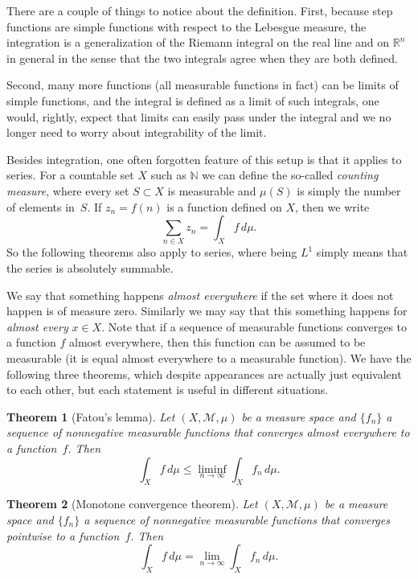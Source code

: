 \documentclass[12pt,openany]{book}
\newcommand{\R}{{\mathbb{R}}}
\newcommand{\N}{{\mathbb{N}}}
\newcommand{\sM}{{\mathscr{M}}}
\newcommand{\myindex}[1]{#1\index{#1}}
\theoremstyle{plain}
\newtheorem{thm}{Theorem}[section]
\theoremstyle{remark}
\theoremstyle{definition}
\theoremstyle{exercise}
\theoremstyle{example}
\begin{document}
There are a couple of things to notice about the definition.  First,
because step functions are simple functions with respect to the Lebesgue measure,
the integration is a generalization of the Riemann integral on the real line
and on $\R^n$ in general in the sense that the two integrals agree when they
are both defined.

Second, many more functions (all measurable functions in fact)
can be limits of simple functions, and the integral is defined as a limit of
such integrals, one would, rightly, expect that limits can easily pass under
the integral and we no longer need to worry about integrability of the
limit.

Besides integration, one often forgotten feature of this setup is that it
applies to series.  For a countable set $X$ such as $\N$ we can define
the so-called \emph{\myindex{counting measure}}, where every set $S \subset
X$ is measurable and $\mu(S)$ is simply the number of elements in~$S$.
If $z_n = f(n)$ is a function defined on $X$, then we write
\begin{equation*}
\sum_{n \in X} z_n = \int_X f \, d\mu .
\end{equation*}
So the following theorems also apply to series, where being $L^1$ simply
means that the series is absolutely summable.

We say that something happens \emph{\myindex{almost everywhere}} if the set
where it does not happen is of measure zero.  Similarly we may say that this
something happens for \emph{almost every} $x \in X$.  Note that if a
sequence of measurable functions converges to a function $f$ almost
everywhere, then this function can be assumed to be measurable (it is equal
almost everywhere to a measurable function).  We have the following three
theorems, which despite appearances are actually just equivalent to each
other, but each statement is useful in different situations.

\begin{thm}[Fatou's lemma]
\pagebreak[2]
Let $(X,\sM,\mu)$ be a measure space and
$\{ f_n \}$ a sequence of nonnegative measurable functions that converges
almost everywhere to a function~$f$.  Then
\begin{equation*}
\int_X f \, d\mu \leq \liminf_{n\to \infty} \int_X f_n \, d\mu .
\end{equation*}
\end{thm}

\begin{thm}[Monotone convergence theorem]
\pagebreak[2]
Let $(X,\sM,\mu)$ be a measure space and
$\{ f_n \}$ a sequence of nonnegative measurable functions that converges
pointwise to a function~$f$.  Then
\begin{equation*}
\int_X f \, d\mu = \lim_{n\to \infty} \int_X f_n \, d\mu .
\end{equation*}
\end{thm}
\end{document}

